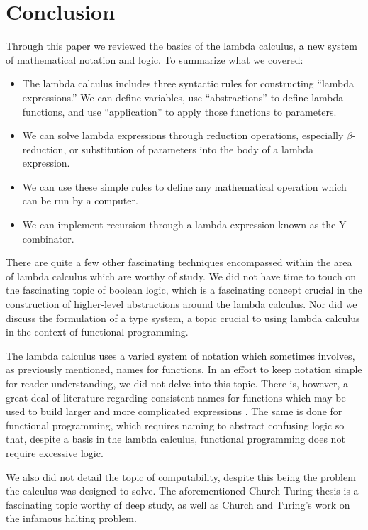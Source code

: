 \documentclass[twocolumn,titlepage,12pt]{article}
\begin{document}
\section{Conclusion}
Through this paper we reviewed the basics of the lambda calculus, a new system of mathematical notation and logic. To summarize what we covered:
\begin{itemize}
  \item{The lambda calculus includes three syntactic rules for constructing ``lambda expressions.'' We can define variables, use ``abstractions'' to define lambda functions, and use ``application'' to apply those functions to parameters.}
  \item{We can solve lambda expressions through reduction operations, especially $\beta$-reduction, or substitution of parameters into the body of a lambda expression.}
  \item{We can use these simple rules to define any mathematical operation which can be run by a computer.}
  \item{We can implement recursion through a lambda expression known as the Y combinator.}
\end{itemize}
There are quite a few other fascinating techniques encompassed within the area of lambda calculus which are worthy of study. We did not have time to touch on the fascinating topic of boolean logic, which is a fascinating concept crucial in the construction of higher-level abstractions around the lambda calculus. Nor did we discuss the formulation of a type system, a topic crucial to using lambda calculus in the context of functional programming.

The lambda calculus uses a varied system of notation which sometimes involves, as previously mentioned, names for functions. In an effort to keep notation simple for reader understanding, we did not delve into this topic. There is, however, a great deal of literature regarding consistent names for functions which may be used to build larger and more complicated expressions \cite{stanfordlc}. The same is done for functional programming, which requires naming to abstract confusing logic so that, despite a basis in the lambda calculus, functional programming does not require excessive logic.

We also did not detail the topic of computability, despite this being the problem the calculus was designed to solve. The aforementioned Church-Turing thesis is a fascinating topic worthy of deep study, as well as Church and Turing's work on the infamous halting problem.
\end{document}
